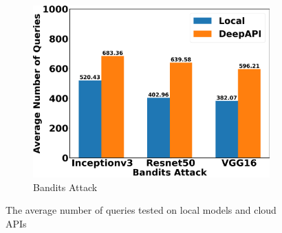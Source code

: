 \begin{figure}[tbp]
\begin{subfigure}[b]{0.32\textwidth}
    \includegraphics[width=\textwidth]{figures/chapter_classification/bandits_number_of_queries.png}
    \caption{Bandits Attack}
    \label{fig:bandits_queries}
\end{subfigure}
\caption{The average number of queries tested on local models and cloud APIs}
\label{fig.queries}
\end{figure}

